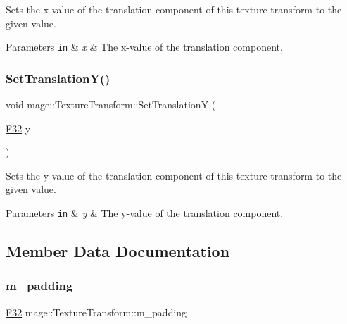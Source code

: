 Sets the x-\/value of the translation component of this texture transform to the given value.


\begin{DoxyParams}[1]{Parameters}
\mbox{\tt in}  & {\em x} & The x-\/value of the translation component. \\
\hline
\end{DoxyParams}
\hypertarget{classmage_1_1_texture_transform_a3c8d11ee771bab59e7960c616ff7261e}{}\label{classmage_1_1_texture_transform_a3c8d11ee771bab59e7960c616ff7261e} 
\subsubsection{\texorpdfstring{Set\+Translation\+Y()}{SetTranslationY()}}
{\footnotesize\ttfamily void mage\+::\+Texture\+Transform\+::\+Set\+TranslationY (\begin{DoxyParamCaption}\item[{\hyperlink{namespacemage_aa97e833b45f06d60a0a9c4fc22ae02c0}{F32}}]{y }\end{DoxyParamCaption})\hspace{0.3cm}{\ttfamily [noexcept]}}

Sets the y-\/value of the translation component of this texture transform to the given value.


\begin{DoxyParams}[1]{Parameters}
\mbox{\tt in}  & {\em y} & The y-\/value of the translation component. \\
\hline
\end{DoxyParams}


\subsection{Member Data Documentation}
\hypertarget{classmage_1_1_texture_transform_a49845212aa6b85f73f9ca2101748bb13}{}\label{classmage_1_1_texture_transform_a49845212aa6b85f73f9ca2101748bb13} 
\subsubsection{\texorpdfstring{m\+\_\+padding}{m\_padding}}
{\footnotesize\ttfamily \hyperlink{namespacemage_aa97e833b45f06d60a0a9c4fc22ae02c0}{F32} mage\+::\+Texture\+Transform\+::m\+\_\+padding\hspace{0.3cm}{\ttfamily [private]}}

